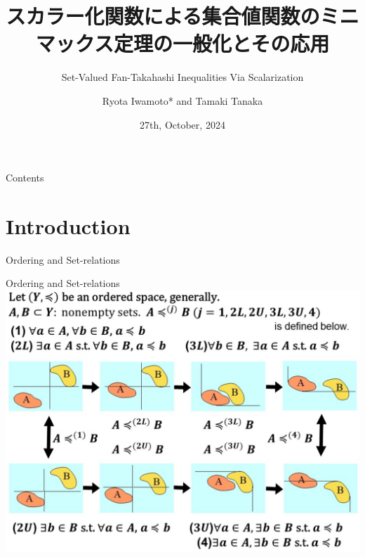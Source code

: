 \documentclass[aspectratio=169, dvipdfmx, 11pt]{beamer}
\title{スカラー化関数による集合値関数のミニマックス定理の一般化とその応用}
\subtitle{Set-Valued Fan-Takahashi Inequalities Via Scalarization}
\author[Ryota Iwamoto]{Ryota Iwamoto* and Tamaki Tanaka}
\institute[Niigata Univ]{Niigata Univ}
\date{27th, October, 2024}
\begin{document}
\maketitle

\begin{frame}{Contents}
  \tableofcontents
\end{frame}

\section{Introduction}

\begin{frame}{Ordering and Set-relations}

\end{frame}

\begin{frame}{Ordering and Set-relations}
  \centering
  \includegraphics[keepaspectratio, scale=0.30]{figures/eps/set-relations_3.eps}
\end{frame}
\end{document}
